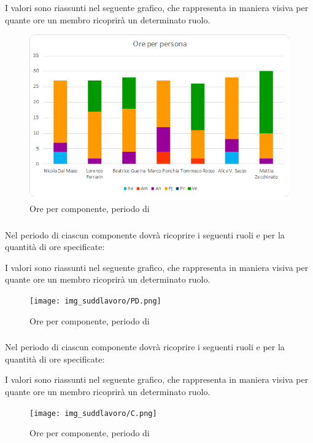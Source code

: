 I valori sono riassunti nel seguente grafico, che rappresenta in maniera visiva per quante ore un membro ricoprirà un determinato ruolo.
\begin{figure}[H]
	\centering
	\includegraphics[width=14cm]{img_suddlavoro/PA.png}
	\caption{Ore per componente, periodo di \PA{}}
\end{figure}

\subsubsection{\PD}
Nel periodo di \PD{} ciascun componente dovrà ricoprire i seguenti ruoli e per la quantità di ore specificate:

I valori sono riassunti nel seguente grafico, che rappresenta in maniera visiva per quante ore un membro ricoprirà un determinato ruolo.
\begin{figure}[H]
	\centering
	\texttt{[image: img\_suddlavoro/PD.png]}
	\caption{Ore per componente, periodo di \PD{}}
\end{figure}

\subsubsection{\Cod}
Nel periodo di \Cod{} ciascun componente dovrà ricoprire i seguenti ruoli e per la quantità di ore specificate:

I valori sono riassunti nel seguente grafico, che rappresenta in maniera visiva per quante ore un membro ricoprirà un determinato ruolo.
\begin{figure}[H]
	\centering
	\texttt{[image: img\_suddlavoro/C.png]}
	\caption{Ore per componente, periodo di \Cod{}}
\end{figure}

